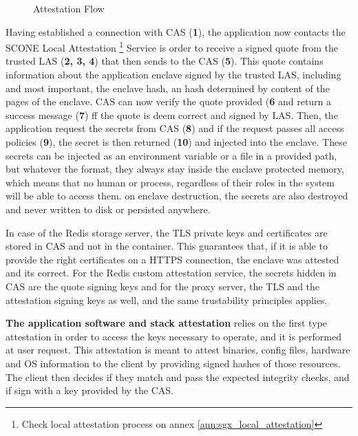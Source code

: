 \begin{figure}[htbp]
  \caption{Attestation Flow}
  \label{fig:attestation_flow}
\end{figure}

Having established a connection with \gls{CAS} (\textbf{1}), the application now contacts the SCONE Local Attestation \footnote{Check local attestation process on annex \ref{ann:sgx_local_attestation}} Service is order to receive a signed quote from the trusted \gls{LAS} (\textbf{2, 3, 4}) that then sends to the \gls{CAS} (\textbf{5}). This quote contains information about the application enclave signed by the trusted \gls{LAS}, including and most important, the enclave hash, an hash determined by content of the pages of the enclave. \gls{CAS} can now verify the quote provided (\textbf{6} and return a success message (\textbf{7}) ff the quote is deem correct and signed by \gls{LAS}. Then, the application request the secrets from \gls{CAS} (\textbf{8}) and if the request passes all access policies (\textbf{9}), the secret is then returned (\textbf{10}) and injected into the enclave. These secrets can be injected as an environment variable or a file in a provided path, but whatever the format, they always stay inside the enclave protected memory, which means that no human or process, regardless of their roles in the system will be able to access them. on enclave destruction, the secrets are also destroyed and never written to disk or persisted anywhere. 

In case of the Redis storage server, the \gls{TLS} private keys and certificates are stored in \gls{CAS} and not in the container. This guarantees that, if it is able to provide the right certificates on a \gls{HTTPS} connection, the enclave was attested and its correct. For the Redis custom attestation service, the secrets hidden in \gls{CAS} are the quote signing keys and for the proxy server, the \gls{TLS} and the attestation signing keys as well, and the same trustability principles applies.

\textbf{The application software and stack attestation} relies on the first type attestation in order to access the keys necessary to operate, and it is performed at user request. This attestation is meant to attest binaries, config files, hardware and \gls{OS} information to the client by providing signed hashes of those resources. The client then decides if they match and pass the expected integrity checks, and if sign with a key provided by the \gls{CAS}.

